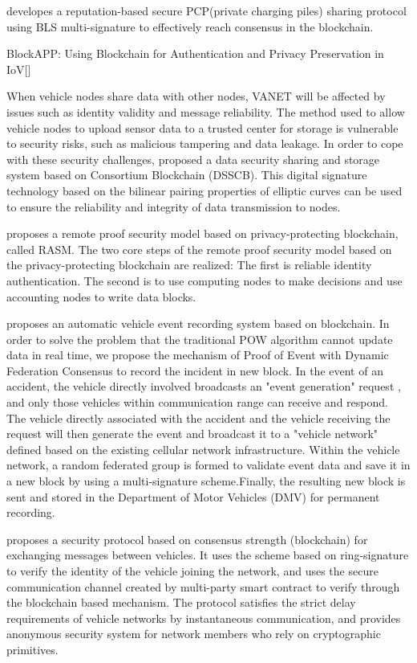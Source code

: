 \cite{ref59} developes a reputation-based secure PCP(private charging piles) sharing protocol using BLS multi-signature to effectively reach consensus in the blockchain.

BlockAPP: Using Blockchain for Authentication and Privacy Preservation in IoV[]


When vehicle nodes share data with other nodes, VANET will be affected by issues such as identity validity and message reliability. The method used to allow vehicle nodes to upload sensor data to a trusted center for storage is vulnerable to security risks, such as malicious tampering and data leakage. In order to cope with these security challenges, \cite{ref30} proposed a data security sharing and storage system based on Consortium Blockchain (DSSCB). This digital signature technology based on the bilinear pairing properties of elliptic curves can be used to ensure the reliability and integrity of data transmission to nodes.

\cite{ref33} proposes a remote proof security model based on privacy-protecting blockchain, called RASM. The two core steps of the remote proof security model based on the privacy-protecting blockchain are realized: The first is reliable identity authentication. The second is to use computing nodes to make decisions and use accounting nodes to write data blocks.

\cite{ref34} proposes an automatic vehicle event recording system based on blockchain. In order to solve the problem that the traditional POW algorithm cannot update data in real time, we propose the mechanism of Proof of Event with Dynamic Federation Consensus to record the incident in new block. In the event of an accident, the vehicle directly involved broadcasts an "event generation" request , and only those vehicles within communication range can receive and respond. The vehicle directly associated with the accident and the vehicle receiving the request will then generate the event and broadcast it to a "vehicle network" defined based on the existing cellular network infrastructure. Within the vehicle network, a random federated group is formed to validate event data and save it in a new block by using a multi-signature scheme.Finally, the resulting new block is sent and stored in the Department of Motor Vehicles (DMV) for permanent recording.

\cite{ref38} proposes a security protocol based on consensus strength (blockchain) for exchanging messages between vehicles. It uses the scheme based on ring-signature to verify the identity of the vehicle joining the network, and uses the secure communication channel created by multi-party smart contract to verify through the blockchain based mechanism. The protocol satisfies the strict delay requirements of vehicle networks by instantaneous communication, and provides anonymous security system for network members who rely on cryptographic primitives.

